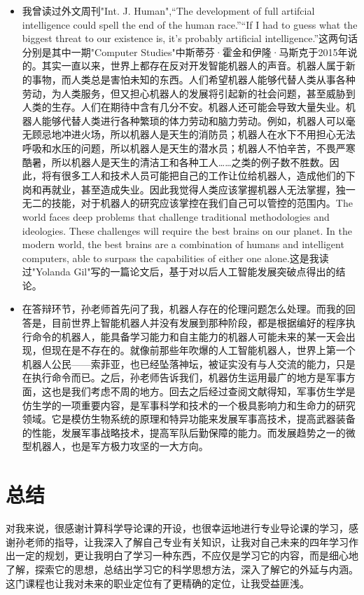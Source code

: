 \documentclass{article}
\begin{document}
\begin{itemize}
    \item 我曾读过外文周刊"Int. J. Human",“The development of full artifcial intelligence could spell the end of the human race.”“If I had to guess what the biggest threat to our existence is, it's probably artiﬁcial intelligence.”\cite{ref4}这两句话分别是其中一期"Computer Studies"中斯蒂芬·霍金和伊隆·马斯克于2015年说的。其实一直以来，世界上都存在反对开发智能机器人的声音。机器人属于新的事物，而人类总是害怕未知的东西。人们希望机器人能够代替人类从事各种劳动，为人类服务，但又担心机器人的发展将引起新的社会问题，甚至威胁到人类的生存。人们在期待中含有几分不安。机器人还可能会导致大量失业。机器人能够代替人类进行各种繁琐的体力劳动和脑力劳动。例如，机器人可以毫无顾忌地冲进火场，所以机器人是天生的消防员；机器人在水下不用担心无法呼吸和水压的问题，所以机器人是天生的潜水员；机器人不怕辛苦，不畏严寒酷暑，所以机器人是天生的清洁工和各种工人……之类的例子数不胜数。因此，将有很多工人和技术人员可能把自己的工作让位给机器人，造成他们的下岗和再就业，甚至造成失业。因此我觉得人类应该掌握机器人无法掌握，独一无二的技能，对于机器人的研究应该掌控在我们自己可以管控的范围内。The world faces deep problems that challenge traditional methodologies and ideologies. These challenges will require the best brains on our planet. In the modern world, the best brains are a combination of humans and intelligent computers, able to surpass the capabilities of either one alone.\citep{ref5}这是我读过"Yolanda Gil"写的一篇论文后，基于对以后人工智能发展突破点得出的结论。
    \item 在答辩环节，孙老师首先问了我，机器人存在的伦理问题怎么处理。而我的回答是，目前世界上智能机器人并没有发展到那种阶段，都是根据编好的程序执行命令的机器人，能具备学习能力和自主能力的机器人可能未来的某一天会出现，但现在是不存在的。就像前那些年吹爆的人工智能机器人，世界上第一个机器人公民——索菲亚，也已经坠落神坛，被证实没有与人交流的能力，只是在执行命令而已。之后，孙老师告诉我们，机器仿生运用最广的地方是军事方面，这也是我们考虑不周的地方。回去之后经过查阅文献得知，军事仿生学是仿生学的一项重要内容，是军事科学和技术的一个极具影响力和生命力的研究领域。它是模仿生物系统的原理和特异功能来发展军事高技术，提高武器装备的性能，发展军事战略技术，提高军队后勤保障的能力。而发展趋势之一的微型机器人，也是军方极力攻坚的一大方向。\par
   
\end{itemize}


\section{总结}
对我来说，很感谢计算科学导论课的开设，也很幸运地进行专业导论课的学习，感谢孙老师的指导，让我深入了解自己专业有关知识，让我对自己未来的四年学习作出一定的规划，更让我明白了学习一种东西，不应仅是学习它的内容，而是细心地了解，探索它的思想，总结出学习它的科学思想方法，深入了解它的外延与内涵。这门课程也让我对未来的职业定位有了更精确的定位，让我受益匪浅。\par
\end{document}

